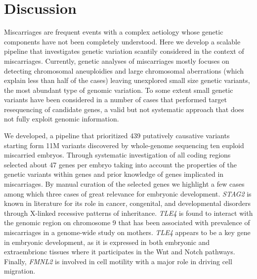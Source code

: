 \section*{Discussion}


Miscarriages are frequent events with a complex aetiology whose genetic components have not been completely understood. Here we develop a scalable pipeline that investigates genetic variation scantily considered in the context of miscarriages. Currently, genetic analyses of miscarriages mostly focuses on detecting chromosomal aneuploidies and large chromosomal aberrations (which explain less than half of the cases) leaving unexplored small size genetic variants, the most abundant type of genomic variation. To some extent small genetic variants have been considered in a number of cases that performed target resequencing of candidate genes, a valid but not systematic approach that does not fully exploit genomic information. 

We developed\gp, a pipeline that prioritized 439 putatively causative variants starting form 11M variants discovered by whole-genome sequencing ten euploid  miscarried embryos. Through systematic investigation of all coding regions \gp selected about 47 genes per embryo taking into account the properties of the genetic variants within genes and prior knowledge of genes implicated in miscarriages. By manual curation of the selected genes we highlight a few cases among which three cases of great relevance for embryonic development. \textit{STAG2} is known in literature for its role in cancer, congenital, and developmental disorders through X-linked recessive patterns of inheritance. \textit{TLE4} is found to interact with the genomic region on chromosome 9 that has been associated with prevalence of miscarriages in a genome-wide study on mothers. \textit{TLE4} appears to be a key gene in embryonic development, as it is expressed in both embryonic and extraembrionc tissues where it participates in the Wnt and Notch pathways. Finally, \textit{FMNL2} is involved in cell motility with a major role in driving cell migration.  


